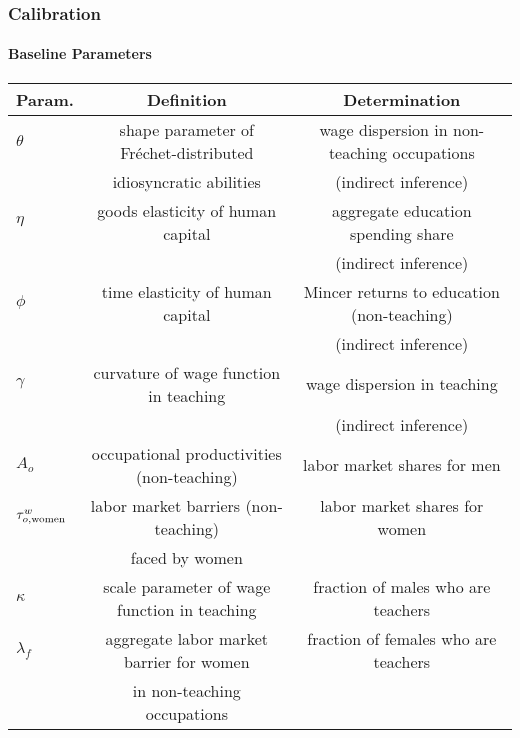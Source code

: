 \documentclass[11pt]{beamer}
\begin{document}
		\begin{frame}
			\frametitle{Calibration}
			\framesubtitle{Baseline Parameters}
			\tiny
			\begin{table}[h!]
				\centering
				\begin{tabular}{lcc}
					\toprule
					Param. & Definition & Determination\\
					\midrule
					$\theta$ & shape parameter of Fr\'echet-distributed & wage dispersion in non-teaching occupations\\
					& idiosyncratic abilities & (indirect inference)\\
					$\eta$ & goods elasticity of human capital & aggregate education spending share  \\
					& & (indirect inference) \\
					$\phi$ & time elasticity of human capital & Mincer returns to education (non-teaching) \\
					& & (indirect inference) \\
					$\gamma$ & curvature of wage function in teaching & wage dispersion in teaching \\
					&& (indirect inference) \\
					\midrule
					$A_{o}$ & occupational productivities (non-teaching) & labor market shares for men\\
					$\tau^{w}_{o,{\rm women}}$ & labor market barriers (non-teaching) & labor market shares for women\\
					& faced by women & \\
					$\kappa$ & scale parameter of wage function in teaching & fraction of males who are teachers \\
					$\lambda_f$ & aggregate labor market barrier for women & fraction of females who are teachers \\
					& in non-teaching occupations & \\
					\bottomrule
				\end{tabular}
				\label{tab:param}
			\end{table}
		\end{frame}
		
\end{document}
